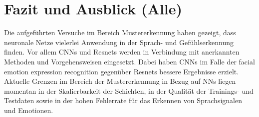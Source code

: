 \section{Fazit und Ausblick (Alle)}
%
Die aufgeführten Versuche im Bereich Mustererkennung haben gezeigt, dass neuronale Netze vielerlei Anwendung in der Sprach- und Gefühlserkennung finden. Vor allem CNNs und Resnets werden in Verbindung mit anerkannten Methoden und Vorgehensweisen eingesetzt. Dabei haben CNNs im Falle der facial emotion expression recognition gegenüber Resnets bessere Ergebnisse erzielt. Aktuelle Grenzen im Bereich der Mustererkennung in Bezug auf NNs liegen momentan in der Skalierbarkeit der Schichten, in der Qualität der Trainings- und Testdaten sowie in der hohen Fehlerrate für das Erkennen von Sprachsignalen und Emotionen.
